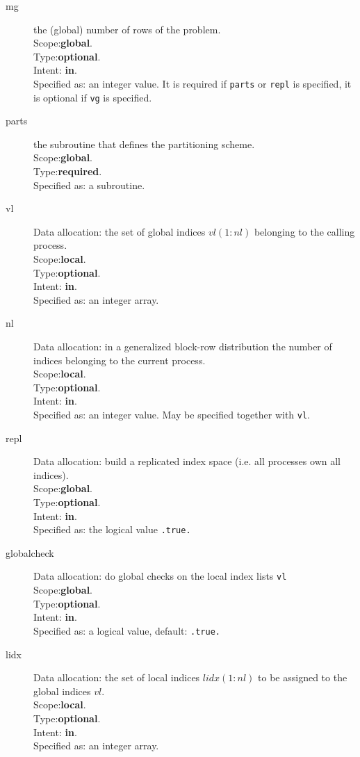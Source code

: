 \begin{description}
\item[mg] the (global) number of rows of the problem.\\
Scope:{\bf global}.\\
Type:{\bf optional}.\\
Intent: {\bf in}.\\
Specified as: an integer value. It is required if \verb|parts| or
\verb|repl| is specified, it is optional if \verb|vg| is specified. 
\item[parts] the subroutine that defines the partitioning scheme.\\
Scope:{\bf global}.\\
Type:{\bf required}.\\
Specified as: a subroutine. 
\item[vl] Data allocation: the set of global indices 
  $vl(1:nl)$ belonging to the calling process. \\
Scope:{\bf local}.\\
Type:{\bf optional}.\\
Intent: {\bf in}.\\
Specified as: an integer array. 
\item[nl] Data allocation: in a generalized block-row distribution the
  number of indices belonging to the current process. \\
Scope:{\bf local}.\\
Type:{\bf optional}.\\
Intent: {\bf in}.\\
Specified as: an integer value. May be specified together with
\verb|vl|. 
\item[repl] Data allocation: build a replicated index space 
  (i.e. all processes own all indices).\\
Scope:{\bf global}.\\
Type:{\bf optional}.\\
Intent: {\bf in}.\\
Specified as: the logical value \verb|.true.|
\item[globalcheck] Data allocation: do global checks on the local
  index lists \verb|vl|\\
Scope:{\bf global}.\\
Type:{\bf optional}.\\
Intent: {\bf in}.\\
Specified as: a logical value, default: \verb|.true.|
\item[lidx] Data allocation: the set of local  indices 
  $lidx(1:nl)$ to be assigned to the global indices $vl$. \\
Scope:{\bf local}.\\
Type:{\bf optional}.\\
Intent: {\bf in}.\\
Specified as: an integer array. 
\end{description}

